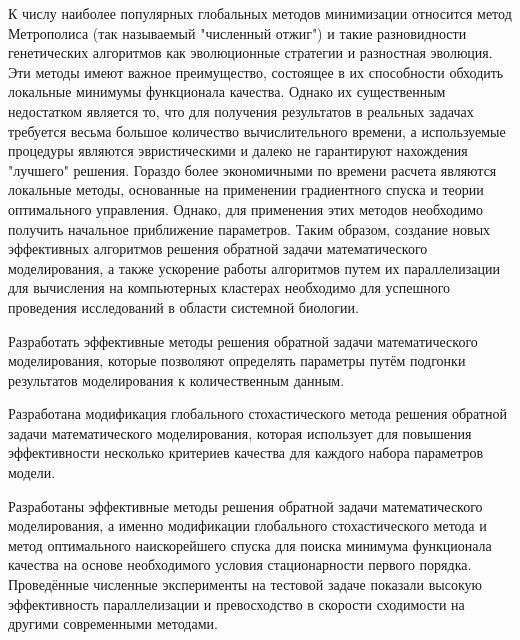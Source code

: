 К числу наиболее популярных глобальных методов минимизации относится метод Метрополиса (так называемый "численный отжиг") и такие разновидности генетических алгоритмов как эволюционные стратегии и разностная эволюция. Эти методы имеют важное преимущество, состоящее в их способности обходить локальные минимумы функционала качества. Однако их существенным недостатком является то, что для получения результатов в реальных задачах требуется весьма большое количество вычислительного времени, а используемые процедуры являются эвристическими и далеко не гарантируют нахождения "лучшего" решения. Гораздо более экономичными по времени расчета являются локальные методы, основанные на применении градиентного спуска и теории оптимального управления. Однако, для применения этих методов необходимо получить начальное приближение параметров. Таким образом, создание новых эффективных алгоритмов решения обратной задачи математического моделирования, а также ускорение работы алгоритмов путем их параллелизации для вычисления на компьютерных кластерах необходимо для успешного проведения исследований в области системной биологии.

Разработать эффективные методы решения обратной задачи математического моделирования, которые позволяют определять параметры путём подгонки результатов моделирования к количественным данным.

Разработана модификация глобального стохастического метода решения обратной задачи математического моделирования, которая использует для повышения эффективности несколько критериев качества для каждого набора параметров модели.

Разработаны эффективные методы решения обратной задачи математического моделирования, а именно модификации глобального стохастического метода и метод оптимального наискорейшего спуска для поиска минимума функционала качества на основе необходимого условия стационарности первого порядка. Проведённые численные эксперименты на тестовой задаче показали высокую эффективность параллелизации и превосходство в скорости сходимости на другими современными методами.
